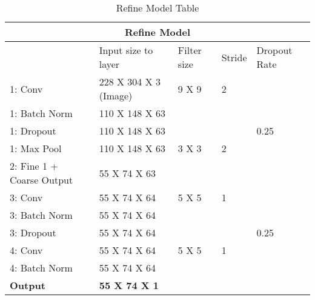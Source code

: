 \begin{table}[h!]
\centering
\begin{tabular}{ |p{3cm}|p{4cm}|p{2cm}|p{2cm}|p{2cm}| }
 \hline
 \multicolumn{5}{|c|}{\textbf{Refine Model}} \\
 \hline
 & Input size to layer & Filter size & Stride & Dropout Rate\\
 \hline
 1: Conv & 228 X 304 X 3 (Image) & 9 X 9 & 2 & \\
 1: Batch Norm & 110 X 148 X 63 & & & \\
 1: Dropout & 110 X 148 X 63 & & & 0.25 \\
 1: Max Pool & 110 X 148 X 63 & 3 X 3 & 2 & \\
 \hline
 2: Fine 1 + Coarse Output & 55 X 74 X 63 & & & \\
 \hline
 3: Conv & 55 X 74 X 64 & 5 X 5 & 1 & \\
 3: Batch Norm & 55 X 74 X 64 & & & \\
 3: Dropout & 55 X 74 X 64 & & & 0.25 \\
 \hline
 4: Conv & 55 X 74 X 64 & 5 X 5 & 1 & \\
 4: Batch Norm & 55 X 74 X 64 & & & \\
 \hline
 \textbf{Output} & \textbf{55 X 74 X 1} & & & \\
 \hline
\end{tabular}
\caption{Refine Model Table}
\label{table:2}
\end{table}